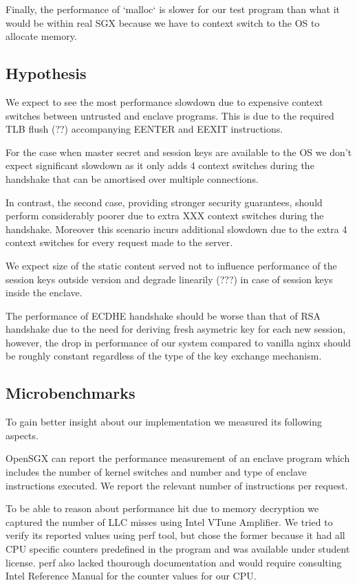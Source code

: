 \documentclass[../main.tex]{subfiles}
\begin{document}
Finally, the performance of `malloc` is slower for our test program
than what it would be within real SGX because we have to context
switch to the OS to allocate memory.

\subsection{Hypothesis}
We expect to see the most performance slowdown due to expensive
context switches between untrusted and enclave programs. This is due
to the required TLB flush (??) accompanying EENTER and EEXIT
instructions.

For the case when master secret and session keys are available to the
OS we don't expect significant slowdown as it only adds 4 context
switches during the handshake that can be amortised over multiple
connections.

In contrast, the second case, providing stronger security guarantees,
should perform considerably poorer due to extra XXX context switches
during the handshake. Moreover this scenario incurs additional
slowdown due to the extra 4 context switches for every request made to
the server.

We expect size of the static content served not to influence
performance of the session keys outside version and degrade linearily
(???) in case of session keys inside the enclave.

The performance of ECDHE handshake should be worse than that of RSA
handshake due to the need for deriving fresh asymetric key for each
new session, however, the drop in performance of our system compared
to vanilla nginx should be roughly constant regardless of the type of
the key exchange mechanism.

\subsection{Microbenchmarks}
To gain better insight about our implementation we measured its
following aspects.

OpenSGX can report the performance measurement of an enclave program
which includes the number of kernel switches and number and type of
enclave instructions executed. We report the relevant number of
instructions per request.

To be able to reason about performance hit due to memory decryption we
captured the number of LLC misses using Intel VTune Amplifier. We
tried to verify its reported values using perf tool, but chose the
former because it had all CPU specific counters predefined in the
program and was available under student license. perf also lacked
thourough documentation and would require consulting Intel Reference
Manual for the counter values for our CPU.
 
\end{document}
